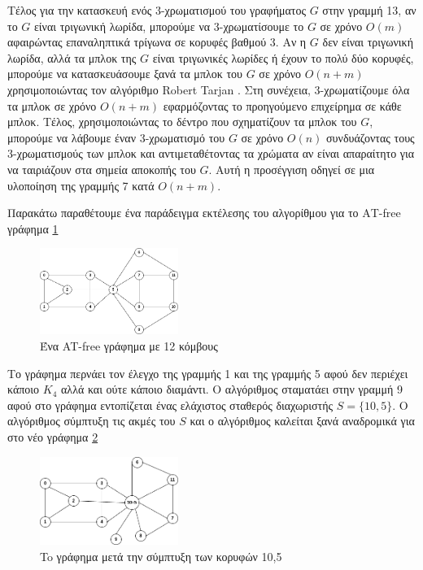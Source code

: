 Τέλος για την κατασκευή ενός 3-χρωματισμού του γραφήματος $G$ στην γραμμή 13, αν το $G$ είναι τριγωνική λωρίδα, μπορούμε να 3-χρωματίσουμε το $G$ σε χρόνο $O(m)$ αφαιρώντας επαναληπτικά τρίγωνα σε κορυφές βαθμού 3. Αν η $G$ δεν είναι τριγωνική λωρίδα, αλλά τα μπλοκ της $G$ είναι τριγωνικές λωρίδες ή έχουν το πολύ δύο κορυφές, μπορούμε να κατασκευάσουμε ξανά τα μπλοκ του $G$ σε χρόνο $O(n + m)$ χρησιμοποιώντας τον αλγόριθμο Robert Tarjan \cite{tarjan-depth-first-search}. Στη συνέχεια, 3-χρωματίζουμε όλα τα μπλοκ σε χρόνο $O(n + m)$ εφαρμόζοντας το προηγούμενο επιχείρημα σε κάθε μπλοκ. Τέλος, χρησιμοποιώντας το δέντρο που σχηματίζουν τα μπλοκ του $G$, μπορούμε να λάβουμε έναν 3-χρωματισμό του $G$ σε χρόνο $O(n)$ συνδυάζοντας τους 3-χρωματισμούς των μπλοκ και αντιμεταθέτοντας τα χρώματα αν είναι απαραίτητο για να ταιριάζουν στα σημεία αποκοπής του $G$. Αυτή η προσέγγιση οδηγεί σε μια υλοποίηση της γραμμής 7 κατά $O(n + m)$.



Παρακάτω παραθέτουμε ένα παράδειγμα εκτέλεσης του αλγορίθμου για το ΑΤ-free γράφημα \ref{fig:ex-coloring-1}

\begin{figure}[H]
	\centering
	\includegraphics[width=0.4\textwidth]{pictures/ex-coloring-1.png} 
	\caption{Ένα AT-free γράφημα με 12 κόμβους}
	\label{fig:ex-coloring-1}
\end{figure}

Το γράφημα περνάει τον έλεγχο της γραμμής 1 και της γραμμής 5 αφού δεν περιέχει κάποιο $K_4$ αλλά και ούτε κάποιο διαμάντι. Ο αλγόριθμος σταματάει στην γραμμή 9 αφού στο γράφημα εντοπίζεται ένας ελάχιστος σταθερός διαχωριστής $S = \{ 10, 5\}$. Ο αλγόριθμος σύμπτυξη τις ακμές του $S$ και ο αλγόριθμος καλείται ξανά αναδρομικά για στο νέο γράφημα \ref{fig:ex-coloring-2}

\begin{figure}[H]
	\centering
	\includegraphics[width=0.4\textwidth]{pictures/ex-coloring-2.png} 
	\caption{To γράφημα μετά την σύμπτυξη των κορυφών 10,5}
	\label{fig:ex-coloring-2}
\end{figure}

